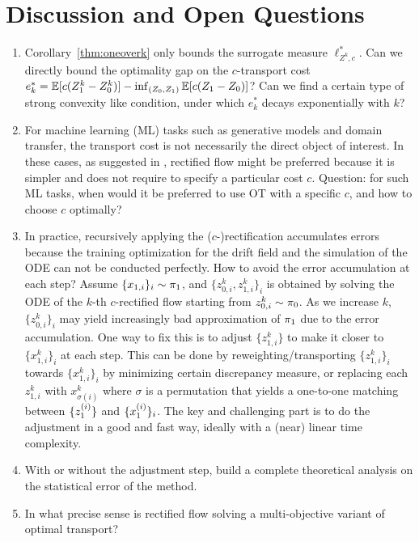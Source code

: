 \section{Discussion and Open Questions}


\begin{enumerate}
    \item Corollary~\ref{thm:oneoverk} only bounds the surrogate measure $\ell^*_{Z^k, c}$. Can we directly bound the optimality gap on the $c$-transport  cost 
    $e^*_k = \mathbb{E}[c(Z_1^k-Z_0^k)] - \inf_{(Z_0,Z_1)} \mathbb{E}[c(Z_1-Z_0)]$?
    Can we find a certain type of strong convexity like condition, under which $e_k^*$ decays exponentially with $k$? 

    \item For machine learning (ML) tasks such as generative models and domain transfer, the transport cost is not necessarily the direct object of interest. 
    In these cases, 
    as suggested in 
    \cite{rectified}, rectified flow might be preferred because it is simpler and does not require to specify a particular cost $c$.  
    Question: for such ML tasks, when would it be preferred to use OT with a specific $c$, and how to choose $c$ optimally? 

    \item In practice, recursively applying the ($c$-)rectification accumulates errors
    because the training optimization for the drift field and the simulation of the ODE 
  can not be conducted perfectly. 
  How 
  to avoid the error accumulation
  at each step? 
  Assume $\{x_{1,i}\}_i\sim {\pi}_1$, and $\{z_{0,i}^k, z_{1,i}^k\}_i$ is obtained by solving the ODE of the $k$-th $c$-rectified flow starting from $z_{0,i}^k \sim {\pi}_0$. 
  As we increase $k$,  $\{z_{0,i}^k\}_i$ may yield increasingly bad approximation of ${\pi}_1$ due to the error accumulation. One way to fix this is to adjust $\{z_{1,i}^k\}$ to make it closer to $\{x_{1,i}^k\}_i$ at each step. This can be done by reweighting/transporting $\{z_{1,i}^k\}_i$  towards $\{x_{1,i}^k\}_i$ by minimizing certain discrepancy measure, 
  or replacing each $z_{1,i}^k$ with $x_{\sigma(i)}^k$ where $\sigma$ is a permutation that yields a   one-to-one matching between $\{z_1^{(i)}\}$ and $\{x_1^{(i)}\}_i$. 
  The key and challenging part is to do the adjustment in a good and fast way, ideally with a (near) linear time complexity.  
  
  \item With or without the adjustment step, 
  build a complete theoretical analysis on the statistical error of the method. 
  
  \item In what precise sense is rectified flow solving a multi-objective variant of optimal transport? 
    
\end{enumerate}


